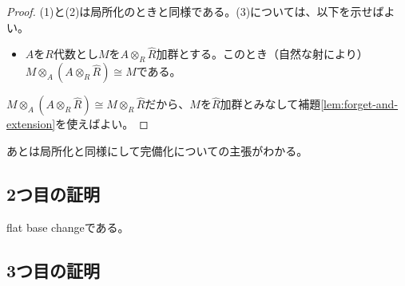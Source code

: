 \documentclass[uplatex, a4paper, dvipdfmx]{jsarticle}
\theoremstyle{definition}
\begin{document}
\begin{proof}
    (1)と(2)は局所化のときと同様である。(3)については、以下を示せばよい。
    \begin{itemize}
        \item $A$を$R$代数とし$M$を$A \otimes_R \widehat{R}$加群とする。このとき（自然な射により）$M \otimes_A (A \otimes_R \widehat{R}) \cong M$である。
    \end{itemize}
    $M \otimes_A (A \otimes_R \widehat{R}) \cong M \otimes_R \widehat{R}$だから、$M$を$\widehat{R}$加群とみなして補題\ref{lem:forget-and-extension}を使えばよい。
\end{proof}
あとは局所化と同様にして完備化についての主張がわかる。
\subsection{2つ目の証明}
flat base changeである。
\subsection{3つ目の証明}
\printbibliography[title=参考文献]
\end{document}
